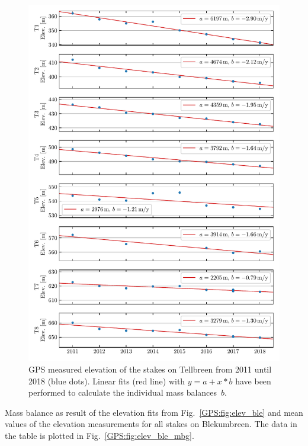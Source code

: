\begin{figure}[h]
    \centering
    \includegraphics[width=\textwidth]{./figs/Elevation_Tellbreen.pdf}
    \caption{GPS measured elevation of the stakes on Tellbreen from 2011 until 2018 (blue dots).
    Linear fits (red line) with $y = a + x*b$ have been performed to calculate the individual mass balances~$b$.}
    \label{GPS:fig:elev_tel}
\end{figure}

\begin{table}[h]
	\caption{Mass balance as result of the elevation fits from Fig.~\ref{GPS:fig:elev_ble} and
	mean values of the elevation measurements for all stakes on Blekumbreen.
    The data in the table is plotted in Fig.~\ref{GPS:fig:elev_ble_mbg}.}
	\centering
	
	\label{GPS:tab:mbal_ble}
\end{table}

